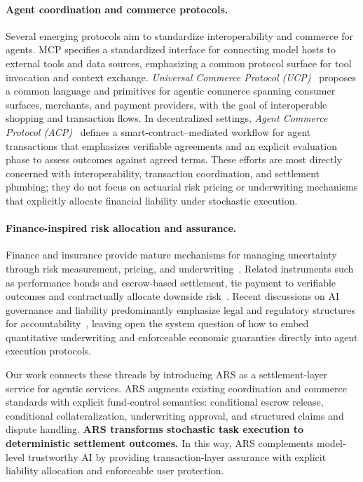 \documentclass{article} %
\begin{document}
\paragraph{Agent coordination and commerce protocols.}
Several emerging protocols aim to standardize interoperability and commerce for agents. MCP specifies a standardized interface for connecting model hosts to external tools and data sources, emphasizing a common protocol surface for tool invocation and context exchange. \emph{Universal Commerce Protocol (UCP)}~\citep{google_ucp_2026} proposes a common language and primitives for agentic commerce spanning consumer surfaces, merchants, and payment providers, with the goal of interoperable shopping and transaction flows. In decentralized settings, \emph{Agent Commerce Protocol (ACP)}~\citep{virtuals_acp_2026} defines a smart-contract–mediated workflow for agent transactions that emphasizes verifiable agreements and an explicit evaluation phase to assess outcomes against agreed terms. These efforts are most directly concerned with interoperability, transaction coordination, and settlement plumbing; they do not focus on actuarial risk pricing or underwriting mechanisms that explicitly allocate financial liability under stochastic execution.

\paragraph{Finance-inspired risk allocation and assurance.}
Finance and insurance provide mature mechanisms for managing uncertainty through risk measurement, pricing, and underwriting~\citep{mcneil2015quantitative, embrechts2000actuarial, meyers1999underwriting, briys2001insurance}. Related instruments such as performance bonds and escrow-based settlement, tie payment to verifiable outcomes and contractually allocate downside risk~\citep{compton2004performance, bessembinder2008measuring, artemenkov2025financial}. Recent discussions on AI governance and liability predominantly emphasize legal and regulatory structures for accountability~\citep{hacker2024sustainable, hacker2023ai, anderljung2023frontier}, leaving open the system question of how to embed quantitative underwriting and enforceable economic guaranties directly into agent execution protocols.

Our work connects these threads by introducing \textsc{ARS} as a settlement-layer service for agentic services. \textsc{ARS} augments existing coordination and commerce standards with explicit fund-control semantics: conditional escrow release, conditional collateralization, underwriting approval, and structured claims and dispute handling. \textbf{\textsc{ARS} transforms stochastic task execution to deterministic settlement outcomes.} In this way, \textsc{ARS} complements model-level trustworthy AI by providing transaction-layer assurance with explicit liability allocation and enforceable user protection.
\end{document}
